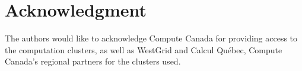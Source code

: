 \documentclass[conference]{IEEEtran}
\begin{document}

\section*{Acknowledgment}

The authors would like to acknowledge Compute Canada for providing access to the computation clusters, as well as WestGrid and Calcul Québec, Compute Canada's regional partners for the clusters used.



\end{document}
